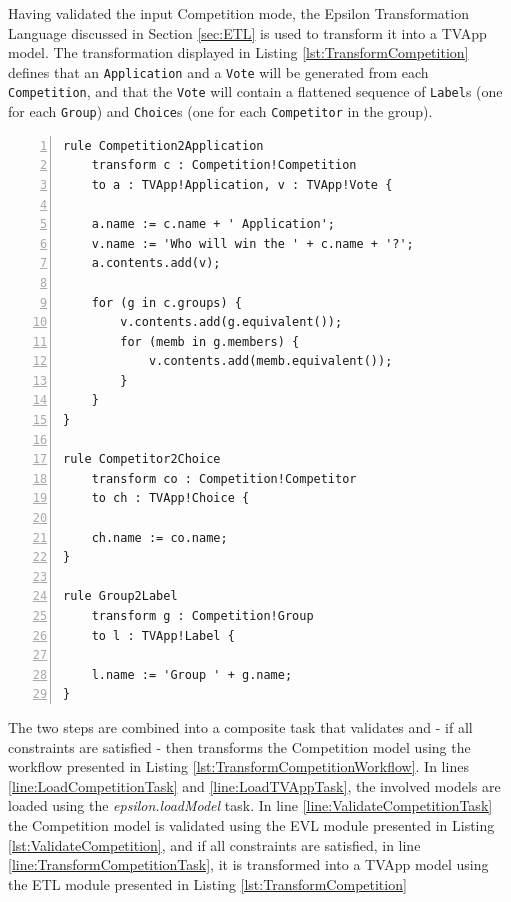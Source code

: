 Having validated the input Competition mode, the Epsilon Transformation Language discussed in Section \ref{sec:ETL} is used to transform it into a TVApp model. The transformation displayed in Listing \ref{lst:TransformCompetition} defines that an \texttt{Application} and a \texttt{Vote} will be generated from each \texttt{Competition}, and that the \texttt{Vote} will contain a flattened sequence of \texttt{Label}s (one for each \texttt{Group}) and \texttt{Choice}s (one for each \texttt{Competitor} in the group).

\begin{lstlisting}[basicstyle=\ttfamily\footnotesize, nolol=true, flexiblecolumns=true, numbers=left, caption=ETL transformation that transforms a Competition model into a TVApp model, tabsize=2, label=lst:TransformCompetition, language=ETL]
rule Competition2Application
	transform c : Competition!Competition
	to a : TVApp!Application, v : TVApp!Vote {

	a.name := c.name + ' Application';
	v.name := 'Who will win the ' + c.name + '?';	
	a.contents.add(v);
	
	for (g in c.groups) {
		v.contents.add(g.equivalent());
		for (memb in g.members) {
			v.contents.add(memb.equivalent());
		}
	}
}

rule Competitor2Choice
	transform co : Competition!Competitor
	to ch : TVApp!Choice {

	ch.name := co.name;
}

rule Group2Label
	transform g : Competition!Group
	to l : TVApp!Label {
	
	l.name := 'Group ' + g.name;
}
\end{lstlisting}

The two steps are combined into a composite task that validates and - if all constraints are satisfied - then transforms the Competition model using the workflow presented in Listing \ref{lst:TransformCompetitionWorkflow}. In lines \ref{line:LoadCompetitionTask} and \ref{line:LoadTVAppTask}, the involved models are loaded using the \emph{epsilon.loadModel} task. In line \ref{line:ValidateCompetitionTask} the Competition model is validated using the EVL module presented in Listing \ref{lst:ValidateCompetition}, and if all constraints are satisfied, in line \ref{line:TransformCompetitionTask}, it is transformed into a TVApp model using the ETL module presented in Listing \ref{lst:TransformCompetition}

